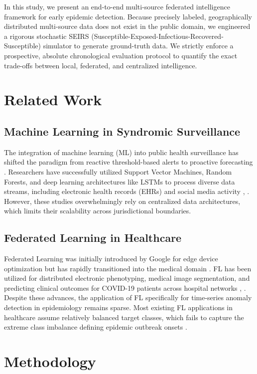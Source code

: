 \documentclass[conference]{IEEEtran}
\begin{document}
In this study, we present an end-to-end multi-source federated intelligence framework for early epidemic detection. Because precisely labeled, geographically distributed multi-source data does not exist in the public domain, we engineered a rigorous stochastic SEIRS (Susceptible-Exposed-Infectious-Recovered-Susceptible) simulator to generate ground-truth data. We strictly enforce a prospective, absolute chronological evaluation protocol to quantify the exact trade-offs between local, federated, and centralized intelligence.

\section{Related Work}

\subsection{Machine Learning in Syndromic Surveillance}
The integration of machine learning (ML) into public health surveillance has shifted the paradigm from reactive threshold-based alerts to proactive forecasting \cite{b9}. Researchers have successfully utilized Support Vector Machines, Random Forests, and deep learning architectures like LSTMs to process diverse data streams, including electronic health records (EHRs) and social media activity \cite{b10}, \cite{b11}. However, these studies overwhelmingly rely on centralized data architectures, which limits their scalability across jurisdictional boundaries.

\subsection{Federated Learning in Healthcare}
Federated Learning was initially introduced by Google for edge device optimization but has rapidly transitioned into the medical domain \cite{b12}. FL has been utilized for distributed electronic phenotyping, medical image segmentation, and predicting clinical outcomes for COVID-19 patients across hospital networks \cite{b13}, \cite{b14}. Despite these advances, the application of FL specifically for time-series anomaly detection in epidemiology remains sparse. Most existing FL applications in healthcare assume relatively balanced target classes, which fails to capture the extreme class imbalance defining epidemic outbreak onsets \cite{b15}.

\section{Methodology}
\end{document}

